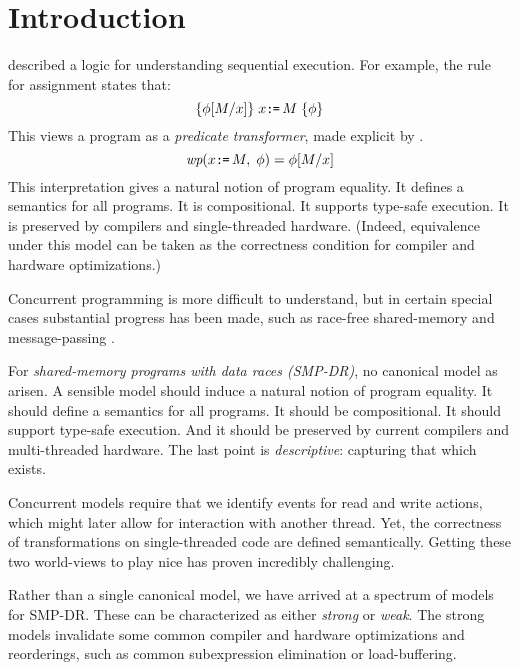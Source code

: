 \section{Introduction}
\label{sec:intro}

\citet{Hoare:1969:ABC:363235.363259} described a logic for understanding
sequential execution.  For example, the rule for assignment states that:
\begin{displaymath}
  \{\phi[M/x]\}\;x\texttt{:}\mkern-1mu\texttt{=}\,M\;\{\phi\}
\end{displaymath}
This views a program as a \emph{predicate transformer}, made explicit by
\citet{Dijkstra:1975:GCN:360933.360975}.
\begin{displaymath}
  \textit{wp}(x\texttt{:}\mkern-1mu\texttt{=}\,M,\;\phi) = \phi[M/x]
\end{displaymath}
This interpretation gives a natural notion of program equality.  It defines a
semantics for all programs.  It is compositional.  It supports type-safe
execution.  It is preserved by compilers and single-threaded hardware.
(Indeed, equivalence under this model can be taken as the correctness
condition for compiler and hardware optimizations.)


Concurrent programming is more difficult to understand, but in certain
special cases substantial progress has been made, such as race-free
shared-memory
\citep{OHearn:2007:RCL:1235896.1236121,OHearn:2019:SL:3310134.3211968} and
message-passing \citep{Hennessy:1980:ONC:646234.758793,Cleaveland2018}.

For \emph{shared-memory programs with data races (SMP-DR)}, no canonical
model as arisen.  A sensible model should induce a natural notion of program
equality.  It should define a semantics for all programs.  It should be
compositional.  It should support type-safe execution.  And it should be
preserved by current compilers and multi-threaded hardware.  The last point
is \emph{descriptive}: capturing that which exists.

Concurrent models require that we identify events for read and write actions,
which might later allow for interaction with another thread.  Yet, the
correctness of transformations on single-threaded code are defined
semantically.  Getting these two world-views to play nice has proven
incredibly challenging.

Rather than a single canonical model, we have arrived at a spectrum of models
for SMP-DR.  These can be characterized as either \emph{strong} or
\emph{weak}.  The strong models invalidate some common compiler and hardware
optimizations and reorderings, such as common subexpression elimination or
load-buffering.

